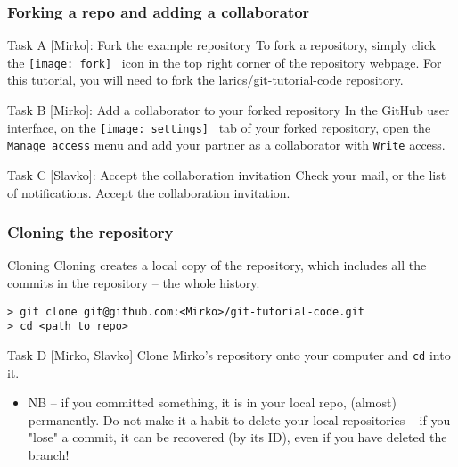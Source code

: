 \begin{frame}[fragile]

\frametitle{Forking a repo and adding a collaborator}

\begin{block}{Task A [Mirko]: Fork the example repository}
	To fork a repository, simply click the \texttt{[image: fork]} \, icon in the top right corner of the repository webpage. For this tutorial, you will need to fork the \href{https://github.com/larics/git-tutorial-code.git}{larics/git-tutorial-code} repository.
\end{block}

\begin{block}{Task B [Mirko]: Add a collaborator to your forked repository}
In the GitHub user interface, on the \texttt{[image: settings]} \, tab of your forked repository, open the \texttt{Manage access} menu and add your partner as a collaborator with \texttt{Write} access.
\end{block}

\begin{block}{Task C [Slavko]: Accept the collaboration invitation}
Check your mail, or the list of notifications. Accept the collaboration invitation.
\end{block}

\end{frame}


\begin{frame}[fragile]

\frametitle{Cloning the repository}

\begin{block}{Cloning}
Cloning creates a local copy of the repository, which includes all the commits in the repository -- the whole history.
\begin{verbatim}
> git clone git@github.com:<Mirko>/git-tutorial-code.git
> cd <path to repo>
\end{verbatim}
\end{block}

\begin{block}{Task D [Mirko, Slavko]}
Clone Mirko's repository onto your computer and \texttt{cd} into it.
\end{block}

\begin{itemize}
    \item NB -- if you committed something, it is in your local repo, (almost) permanently. Do not make it a habit to delete your local repositories -- if you "lose" a commit, it can be recovered (by its ID), even if you have deleted the branch!
\end{itemize}
	
\end{frame}


